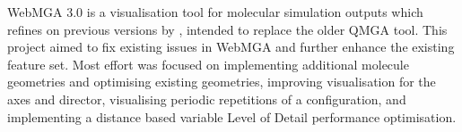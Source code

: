 WebMGA 3.0 is a visualisation tool for molecular simulation outputs which refines on previous versions by \textcite{Battistini_2021,webmga_2}, intended to replace the older QMGA tool. This project aimed to fix existing issues in WebMGA and further enhance the existing feature set. Most effort was focused on implementing additional molecule geometries and optimising existing geometries, improving visualisation for the axes and director, visualising periodic repetitions of a configuration, and implementing a distance based variable Level of Detail performance optimisation.
